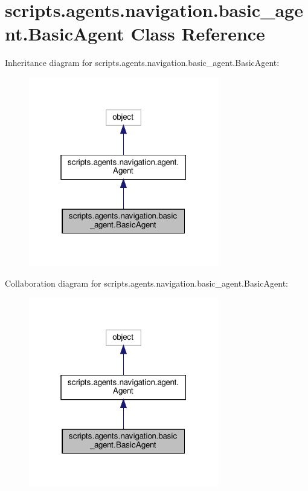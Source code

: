 \hypertarget{classscripts_1_1agents_1_1navigation_1_1basic__agent_1_1BasicAgent}{}\section{scripts.\+agents.\+navigation.\+basic\+\_\+agent.\+Basic\+Agent Class Reference}
\label{classscripts_1_1agents_1_1navigation_1_1basic__agent_1_1BasicAgent}


Inheritance diagram for scripts.\+agents.\+navigation.\+basic\+\_\+agent.\+Basic\+Agent\+:
\nopagebreak
\begin{figure}[H]
\begin{center}
\leavevmode
\includegraphics[width=235pt]{d7/d3d/classscripts_1_1agents_1_1navigation_1_1basic__agent_1_1BasicAgent__inherit__graph}
\end{center}
\end{figure}


Collaboration diagram for scripts.\+agents.\+navigation.\+basic\+\_\+agent.\+Basic\+Agent\+:
\nopagebreak
\begin{figure}[H]
\begin{center}
\leavevmode
\includegraphics[width=235pt]{dd/ddc/classscripts_1_1agents_1_1navigation_1_1basic__agent_1_1BasicAgent__coll__graph}
\end{center}
\end{figure}
